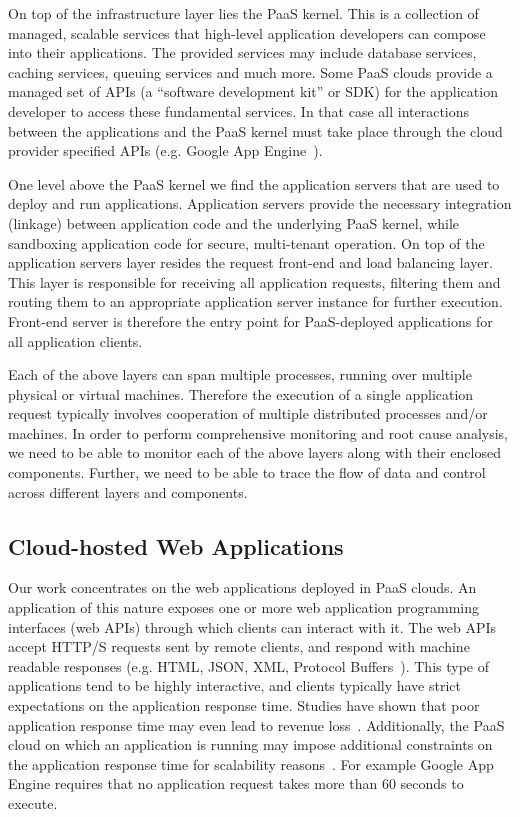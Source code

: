On top of the infrastructure layer lies the PaaS kernel. This is a collection of managed, scalable
services that high-level application developers can compose into their applications. The provided services
may include database services, caching services, queuing services and much more. Some PaaS clouds
provide a managed set of APIs (a ``software development
kit'' or SDK) for the application developer to access these fundamental services. 
In that case all interactions between the applications and the PaaS kernel must take place through
the cloud provider specified APIs (e.g. Google App Engine~\cite{gae}). 

One level above the PaaS kernel we find the application servers that are used to deploy and run
applications. Application servers provide the necessary integration (linkage) between application code and the
underlying PaaS kernel, while sandboxing application code for secure, multi-tenant operation. On top
of the application servers layer resides the request
front-end and load balancing layer. This layer is responsible
for receiving all application requests, filtering them and routing them to an appropriate application
server instance for further execution. Front-end server is therefore the entry point for PaaS-deployed
applications for all application clients.

Each of the above layers can span multiple processes, running over multiple physical or virtual
machines. Therefore the execution of a single application request typically involves cooperation
of multiple distributed processes and/or machines. In order to perform comprehensive monitoring
and root cause analysis, we need to be able to monitor each of the above layers along with their
enclosed components. Further, we need to be able to trace the flow of data and control
across different layers and components.

\subsection{Cloud-hosted Web Applications} 


Our work concentrates on the web
applications deployed in PaaS clouds. An application of this nature exposes
one or more web application programming interfaces (web APIs) through which
clients can interact with it. The web APIs accept HTTP/S requests sent by
remote clients, and respond with machine readable responses (e.g. HTML, JSON,
XML, Protocol Buffers~\cite{protobuff}). This type of applications tend to be highly
interactive, and clients typically have strict expectations on the application
response time. Studies have shown that poor application response
time may even lead to revenue loss~\cite{latency-matters}.
Additionally, the PaaS cloud on
which an application is running may impose additional constraints on the
application response time for scalability
reasons~\cite{azure-limits,gae-limits}.  For example Google App Engine
requires that no application request takes more than 60 seconds to execute.


